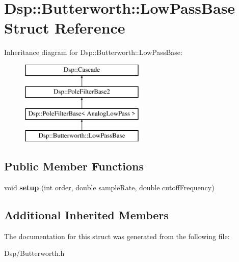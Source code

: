 \hypertarget{structDsp_1_1Butterworth_1_1LowPassBase}{\section{Dsp\-:\-:Butterworth\-:\-:Low\-Pass\-Base Struct Reference}
\label{structDsp_1_1Butterworth_1_1LowPassBase}
}
Inheritance diagram for Dsp\-:\-:Butterworth\-:\-:Low\-Pass\-Base\-:\begin{figure}[H]
\begin{center}
\leavevmode
\includegraphics[height=4.000000cm]{structDsp_1_1Butterworth_1_1LowPassBase}
\end{center}
\end{figure}
\subsection*{Public Member Functions}
\begin{DoxyCompactItemize}
\item 
\hypertarget{structDsp_1_1Butterworth_1_1LowPassBase_a4a57b07ec96a1069117e0ef48d5b0a20}{void {\bfseries setup} (int order, double sample\-Rate, double cutoff\-Frequency)}\label{structDsp_1_1Butterworth_1_1LowPassBase_a4a57b07ec96a1069117e0ef48d5b0a20}

\end{DoxyCompactItemize}
\subsection*{Additional Inherited Members}


The documentation for this struct was generated from the following file\-:\begin{DoxyCompactItemize}
\item 
Dsp/Butterworth.\-h\end{DoxyCompactItemize}
